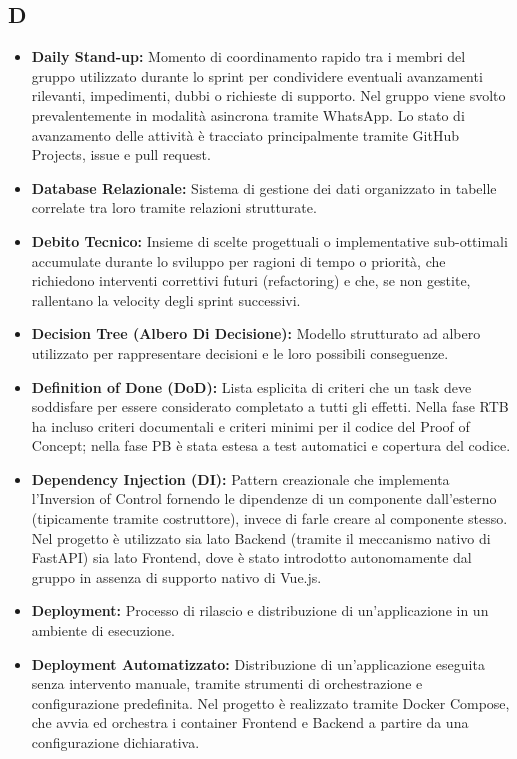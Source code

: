 \subsection*{D}
\begin{itemize}[leftmargin=*]
      \item \textbf{Daily Stand-up:}
      Momento di coordinamento rapido tra i membri del gruppo utilizzato durante
      lo sprint per condividere eventuali avanzamenti rilevanti, impedimenti,
      dubbi o richieste di supporto. Nel gruppo viene svolto prevalentemente in
      modalità asincrona tramite WhatsApp. Lo stato di avanzamento delle attività
      è tracciato principalmente tramite GitHub Projects, issue e pull request.
      \item \textbf{Database Relazionale:} Sistema di gestione dei dati organizzato in tabelle correlate tra loro tramite relazioni strutturate.
      \item \textbf{Debito Tecnico:} Insieme di scelte progettuali o implementative
      sub-ottimali accumulate durante lo sviluppo per ragioni di tempo o priorità,
      che richiedono interventi correttivi futuri (refactoring) e che, se non gestite,
      rallentano la velocity degli sprint successivi.
      \item \textbf{Decision Tree (Albero Di Decisione):} Modello strutturato ad albero utilizzato per rappresentare decisioni e le loro possibili conseguenze.
      \item \textbf{Definition of Done (DoD):} Lista esplicita di criteri che un task
      deve soddisfare per essere considerato completato a tutti gli effetti. Nella fase
      RTB ha incluso criteri documentali e criteri minimi per il codice del Proof of
      Concept; nella fase PB è stata estesa a test automatici e copertura del
      codice.
      \item \textbf{Dependency Injection (DI):} Pattern creazionale che implementa l'Inversion of Control fornendo le dipendenze di un componente dall'esterno (tipicamente tramite costruttore), invece di farle creare al componente stesso. Nel progetto è utilizzato sia lato Backend (tramite il meccanismo nativo di FastAPI) sia lato Frontend, dove è stato introdotto autonomamente dal gruppo in assenza di supporto nativo di Vue.js.
      \item \textbf{Deployment:} Processo di rilascio e distribuzione di un’applicazione in un ambiente di esecuzione.
      \item \textbf{Deployment Automatizzato:} Distribuzione di un'applicazione eseguita senza intervento manuale, tramite strumenti di orchestrazione e configurazione predefinita. Nel progetto è realizzato tramite Docker Compose, che avvia ed orchestra i container Frontend e Backend a partire da una configurazione dichiarativa.

\end{itemize}
